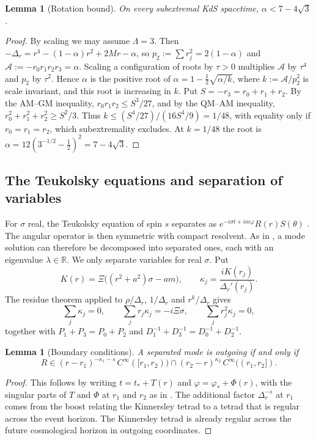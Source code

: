 \documentclass[11pt]{amsart}
\newtheorem{lemma}[theorem]{Lemma}
\theoremstyle{definition}
\theoremstyle{remark}
\numberwithin{equation}{section}
\newcommand{\R}{\mathbb{R}}
\begin{document}
\begin{lemma}[Rotation bound]\label{lem:alpha}
On every subextremal KdS spacetime, $\alpha<7-4\sqrt3$.
\end{lemma}
\begin{proof}
By scaling we may assume $\Lambda=3$. Then $-\Delta_r=r^4-(1-\alpha)r^2+2Mr-\alpha$, so $p_2:=\sum r_j^2=2(1-\alpha)$
and $\mathcal A:=-r_0r_1r_2r_3=\alpha$. Scaling a configuration of roots by $\tau>0$ multiplies $\mathcal A$ by $\tau^4$ and
$p_2$ by $\tau^2$. Hence $\alpha$ is the positive root of $\alpha=1-\frac12\sqrt{\alpha/k}$, where $k:=\mathcal A/p_2^2$
is scale invariant, and this root is increasing in $k$. Put $S=-r_3=r_0+r_1+r_2$. By the AM--GM inequality,
$r_0r_1r_2\le S^3/27$, and by the QM--AM inequality, $r_0^2+r_1^2+r_2^2\ge S^2/3$. Thus
$k\le(S^4/27)/(16S^4/9)=1/48$, with equality only if $r_0=r_1=r_2$, which subextremality excludes. At $k=1/48$ the
root is $\alpha=12(3^{-1/2}-\frac12)^2=7-4\sqrt3$.
\end{proof}

\subsection{The Teukolsky equations and separation of variables}
For $\sigma$ real, the Teukolsky equation of spin $s$ separates as $e^{-i\sigma t+im\varphi}R(r)S(\theta)$
\cite{Kha83}. The angular operator is then symmetric with compact resolvent. As in \cite[\S3]{Hin26}, a mode solution
can therefore be decomposed into separated ones, each with an eigenvalue $\lambda\in\R$. We only separate variables
for real $\sigma$. Put
\[
K(r)=\Xi\big((r^2+a^2)\sigma-am\big),\qquad \kappa_j=\frac{iK(r_j)}{\Delta_r'(r_j)}.
\]
The residue theorem applied to $\rho/\Delta_r$, $1/\Delta_r$ and $r^k/\Delta_r$ gives
\begin{equation}\label{eq:residues}
\sum_j\kappa_j=0,\qquad\sum_jr_j\kappa_j=-i\Xi\sigma,\qquad\sum_jr_j^2\kappa_j=0,
\end{equation}
together with $P_1+P_3=P_0+P_2$ and $D_1^{-1}+D_3^{-1}=D_0^{-1}+D_2^{-1}$.

\begin{lemma}[Boundary conditions]\label{lem:bc}
A separated mode is outgoing if and only if
\[
R\in(r-r_1)^{-\kappa_1-s}\,C^\infty([r_1,r_2))\cap(r_2-r)^{\kappa_2}\,C^\infty((r_1,r_2]).
\]
\end{lemma}
\begin{proof}
This follows by writing $t=t_*+T(r)$ and $\varphi=\varphi_*+\Phi(r)$, with the singular parts of $T$ and $\Phi$ at
$r_1$ and $r_2$ as in \cite[(3.4)]{Hin26}. The additional factor $\Delta_r^{-s}$ at $r_1$ comes from the boost
relating the Kinnersley tetrad to a tetrad that is regular across the event horizon. The Kinnersley tetrad is
already regular across the future cosmological horizon in outgoing coordinates.
\end{proof}
\end{document}
